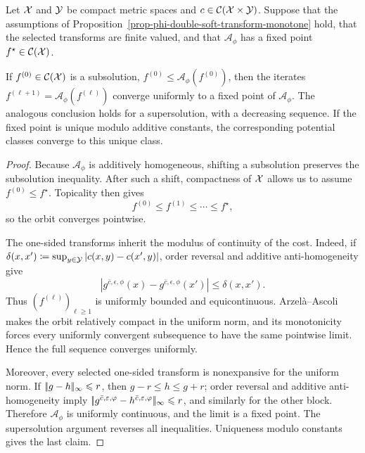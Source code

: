 \begin{prop}\label{prop-fortet-monotone}
	Let $\mathcal{X}$ and $\mathcal{Y}$ be compact metric spaces and $c\in\mathcal{C}(\mathcal{X}\times\mathcal{Y})$. Suppose that the assumptions of Proposition~\ref{prop-phi-double-soft-transform-monotone} hold, that the selected transforms are finite valued, and that $\mathcal A_\phi$ has a fixed point $f^\star\in\mathcal{C}(\mathcal{X})$.

	If $f^{(0)}\in\mathcal{C}(\mathcal{X})$ is a subsolution, $f^{(0)}\leq\mathcal A_\phi(f^{(0)})$, then the iterates $f^{(\ell+1)}=\mathcal A_\phi(f^{(\ell)})$ converge uniformly to a fixed point of $\mathcal A_\phi$. The analogous conclusion holds for a supersolution, with a decreasing sequence. If the fixed point is unique modulo additive constants, the corresponding potential classes converge to this unique class.
\end{prop}

\begin{proof}
	Because $\mathcal A_\phi$ is additively homogeneous, shifting a subsolution preserves the subsolution inequality. After such a shift, compactness of $\mathcal{X}$ allows us to assume $f^{(0)}\leq f^\star$. Topicality then gives
	\[
		f^{(0)}\leq f^{(1)}\leq\cdots\leq f^\star,
	\]
	so the orbit converges pointwise.

	The one-sided transforms inherit the modulus of continuity of the cost. Indeed, if
	\(\delta(x,x')\coloneqq\sup_{y\in\mathcal{Y}}|c(x,y)-c(x',y)|\),
	order reversal and additive anti-homogeneity give
	\[
		\left|g^{\bar c,\epsilon,\phi}(x)-g^{\bar c,\epsilon,\phi}(x')\right|
		\leq \delta(x,x').
	\]
	Thus $(f^{(\ell)})_{\ell\geq1}$ is uniformly bounded and equicontinuous. Arzel\`a--Ascoli makes the orbit relatively compact in the uniform norm, and its monotonicity forces every uniformly convergent subsequence to have the same pointwise limit. Hence the full sequence converges uniformly.

	Moreover, every selected one-sided transform is nonexpansive for the uniform norm. If $|\!| g-h |\!|_\infty\leqslant r$, then $g-r\leq h\leq g+r$; order reversal and additive anti-homogeneity imply $|\!| g^{\bar c,\varepsilon,\varphi}-h^{\bar c,\varepsilon,\varphi} |\!|_\infty\leqslant r$, and similarly for the other block. Therefore $\mathcal A_\phi$ is uniformly continuous, and the limit is a fixed point. The supersolution argument reverses all inequalities. Uniqueness modulo constants gives the last claim.
\end{proof}

